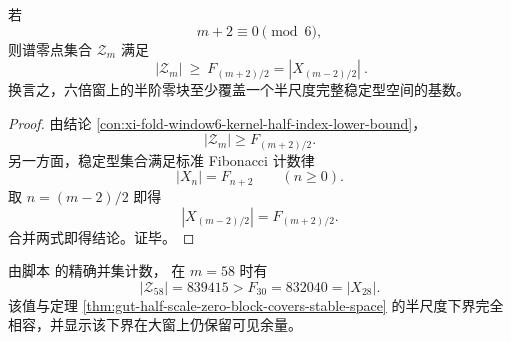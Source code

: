 \begin{theorem}[六倍窗零块至少覆盖一个半尺度完整稳定型空间]\label{thm:gut-half-scale-zero-block-covers-stable-space}
若
\[
m+2\equiv 0\pmod 6,
\]
则谱零点集合 \(\mathcal Z_m\) 满足
\[
\boxed{\ |\mathcal Z_m|\ \ge\ F_{(m+2)/2}=|X_{(m-2)/2}|\ }.
\]
换言之，六倍窗上的半阶零块至少覆盖一个半尺度完整稳定型空间的基数。
\end{theorem}
\begin{proof}
由结论 \ref{con:xi-fold-window6-kernel-half-index-lower-bound}，
\[
|\mathcal Z_m|\ge F_{(m+2)/2}.
\]
另一方面，稳定型集合满足标准 Fibonacci 计数律
\[
|X_n|=F_{n+2}\qquad(n\ge 0).
\]
取
\(
n=(m-2)/2
\)
即得
\[
|X_{(m-2)/2}|=F_{(m+2)/2}.
\]
合并两式即得结论。证毕。
\end{proof}

\begin{remark}[大窗数值核验]
由脚本 \texttt{} 的精确并集计数，
在 \(m=58\) 时有
\[
|\mathcal Z_{58}|=839415>F_{30}=832040=|X_{28}|.
\]
该值与定理 \ref{thm:gut-half-scale-zero-block-covers-stable-space} 的半尺度下界完全相容，并显示该下界在大窗上仍保留可见余量。
\end{remark}

